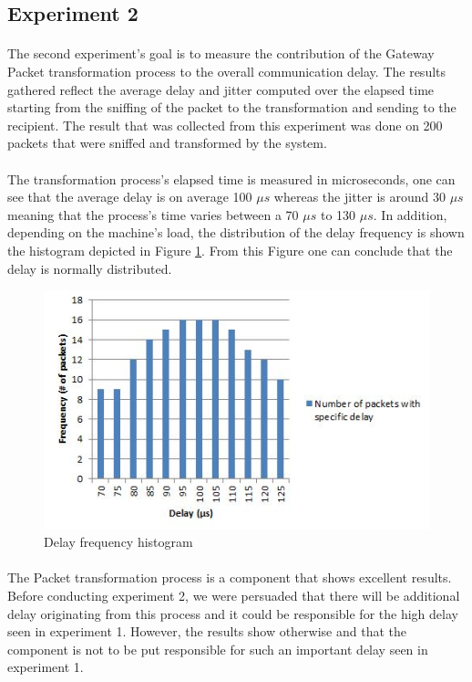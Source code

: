 \documentclass[12pt,a4paper,final]{report}
\begin{document}
\subsection{Experiment 2}
\paragraph{}
The second experiment's goal is to measure the contribution of the Gateway Packet transformation process to the overall communication delay. The results gathered reflect the average delay and jitter computed over the elapsed time starting from the sniffing of the packet to the transformation and sending to the recipient. The result that was collected from this experiment was done on 200 packets that were sniffed and transformed by the system. 

\paragraph{}
The transformation process's elapsed time is measured in microseconds, one can see that the average delay is on average 100 $\mu s$ whereas the jitter is around 30 $\mu s$ meaning that the process's time varies between a 70 $\mu s$ to 130 $\mu s$. In addition, depending on the machine's load, the distribution of the delay frequency is shown the histogram depicted in Figure \ref{fig:histogram}. From this Figure one can conclude that the delay is normally distributed.
\begin{figure}[htbp]
 \centering
 \includegraphics[scale=0.9]{img/histogram.JPG}
 \caption{Delay frequency histogram}
 \label{fig:histogram}
 \end{figure}
\paragraph{}
 The Packet transformation process is a component that shows excellent results. Before conducting experiment 2, we were persuaded that there will be additional delay originating from this process and it could be responsible for the high delay seen in experiment 1. However, the results show otherwise and that the component is not to be put responsible for such an important delay seen in experiment 1.
\end{document}
